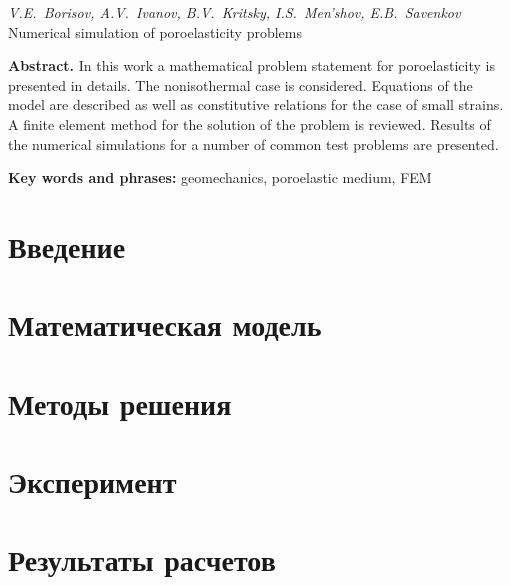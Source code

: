 \documentclass[a4paper, 12pt]{article}
\begin{document}
\noindent\emph{ V.E.~Borisov, \; A.V.~Ivanov, \; B.V.~Kritsky, \; I.S.~Men'shov, \; E.B.~Savenkov} \\Numerical simulation of poroelasticity problems

\vspace*{3mm}

\noindent\textbf{ Abstract.}
In this work a mathematical problem statement for poroelasticity is
presented in details. The nonisothermal case is considered.
Equations of the model are described as well as constitutive relations
for the case of small strains. A finite element method for the
solution of the problem is reviewed. Results of the numerical
simulations for a number of common test problems are presented.



\vspace*{3mm}

\noindent\textbf{Key words and phrases:} geomechanics, poroelastic medium, FEM

\tableofcontents


\newpage

\section{Введение}
\label{sec:intro}


\section{Математическая модель}
\label{sec:mat_model}
%


\section{Методы решения}
\label{sec:methods}
%


\section{Эксперимент}
\label{sec:experiment}
%


\section{Результаты расчетов}
\label{sec:results}
%

\end{document}

